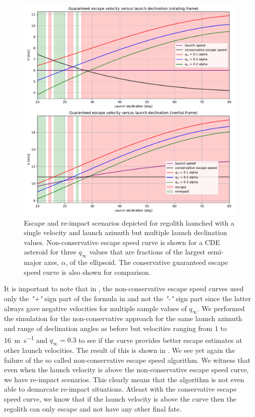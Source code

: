 \begin{figure}[htb]
\centering
\captionsetup{justification=centering}
\includegraphics[width=\textwidth, height=0.7\textheight, keepaspectratio=true]{non_conservative_escape_speed/multiple_qinfinity_plus.pdf}
\caption{Escape and re-impact scenarios depicted for regolith launched with a single velocity and launch azimuth but multiple launch declination values. Non-conservative escape speed curve is shown for a \gls{CDE} asteroid for three $q_\infty$ values that are fractions of the largest semi-major axes, $\alpha$, of the ellipsoid. The conservative guaranteed escape speed curve is also shown for comparison.}
\label{fig:non_conservative_escape_multiple_qinfinity_single_velocity}
\end{figure}
\FloatBarrier
It is important to note that in , the non-conservative escape speed curves used only the \emph{"+"} sign part of the formula in  and not the \emph{"-"} sign part since the latter always gave negative velocities for multiple sample values of $q_\infty$. We performed the simulation for the non-conservative approach for the same launch azimuth and range of declination angles as before but velocities ranging from 1 to \SI{16}{\metre \per \second} and $q_\infty=0.3$ to see if the curve provides better escape estimates at other launch velocities. The result of this is shown in . We see yet again the failure of the so called non-conservative escape speed algorithm. We witness that even when the launch velocity is above the non-conservative escape speed curve, we have re-impact scenarios. This clearly means that the algorithm is not even able to demarcate re-impact situations. Atleast with the conservative escape speed curve, we know that if the launch velocity is above the curve then the regolith can only escape and not have any other final fate.
